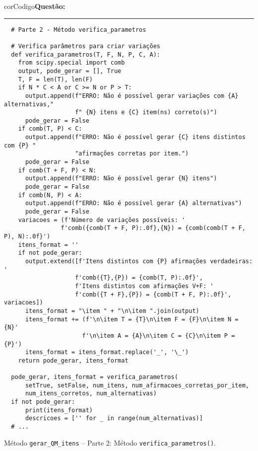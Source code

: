 \begin{listing}[!ht]
  \begin{myboxCode}{corCodigo}{\textbf{Questão: }}\vspace{3mm}
  \hrule
  \begin{verbatim}
  # Parte 2 - Método verifica_parametros

  # Verifica parâmetros para criar variações
  def verifica_parametros(T, F, N, P, C, A):
    from scipy.special import comb
    output, pode_gerar = [], True
    T, F = len(T), len(F)
    if N * C < A or C >= N or P > T:
      output.append(f"ERRO: Não é possível gerar variações com {A} alternativas,"
                    f" {N} itens e {C} item(ns) correto(s)")
      pode_gerar = False
    if comb(T, P) < C:
      output.append(f"ERRO: Não é possível gerar {C} itens distintos com {P} "
                    "afirmações corretas por item.")
      pode_gerar = False
    if comb(T + F, P) < N:
      output.append(f"ERRO: Não é possível gerar {N} itens")
      pode_gerar = False
    if comb(N, P) < A:
      output.append(f"ERRO: Não é possível gerar {A} alternativas")
      pode_gerar = False
    variacoes = (f'Número de variações possíveis: '
                f'comb({comb(T + F, P):.0f},{N}) = {comb(comb(T + F, P), N):.0f}')
    itens_format = ''
    if not pode_gerar:
      output.extend([f'Itens distintos com {P} afirmações verdadeiras: '
                    f'comb({T},{P}) = {comb(T, P):.0f}',
                    f'Itens distintos com afirmações V+F: '
                    f'comb({T + F},{P}) = {comb(T + F, P):.0f}', variacoes])
      itens_format = "\item " + "\n\item ".join(output)
      itens_format += (f'\n\item T = {T}\n\item F = {F}\n\item N = {N}'
                      f'\n\item A = {A}\n\item C = {C}\n\item P = {P}')
      itens_format = itens_format.replace('_', '\_')
    return pode_gerar, itens_format

  pode_gerar, itens_format = verifica_parametros(
      setTrue, setFalse, num_itens, num_afirmacoes_corretas_por_item,
      num_itens_corretos, num_alternativas)
  if not pode_gerar:
      print(itens_format)
      descricoes = ['' for _ in range(num_alternativas)]
  # ...
\end{verbatim}
\end{myboxCode}
\caption{Método \texttt{gerar\_QM\_itens} -- Parte 2: Método \texttt{verifica\_parametros()}.}
\label{lst:questaoQM_gerar_QM_itens_parte2}
\end{listing}


